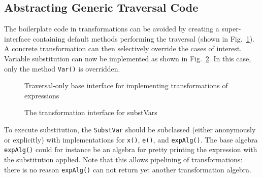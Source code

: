 \subsection{Abstracting Generic Traversal Code}

The boilerplate code in transformations can be avoided by creating a
super-interface containing default methods performing the traversal
(shown in Fig.~\ref{generic_transform}). A concrete transformation can
then selectively override the cases of interest. Variable substitution
can now be implemented as shown in Fig.~\ref{substvars_with_id}. In
this case, only the method \lstinline{Var()} is overridden.


\begin{figure}[t]
\vspace{-.1in}
\caption{Traversal-only base interface for implementing transformations of expressions}
\label{generic_transform}
\end{figure}


\begin{figure}[t]
\vspace{-.1in}
\caption{The transformation interface for substVars}
\label{substvars_with_id}
\end{figure}


To execute substitution, the \lstinline{SubstVar} should be subclassed
(either anonymously or explicitly) with implementations for
\lstinline{x()}, \lstinline{e()}, and \lstinline{expAlg()}. The base
algebra \lstinline{expAlg()} could for instance be an algebra for
pretty printing the expression with the substitution applied. Note
that this allows pipelining of transformations: there is no reason
\lstinline{expAlg()} can not return yet another transformation
algebra.

\begin{comment}
\haoyuan{Begin: client code.}

Here we also give the client code. With the same expression \lstinline{x + (y + 2)}, a \lstinline{SubstVar} object is created. The base algebra \lstinline{expAlg()} here is implemented with an instance of \lstinline{FreeVars}, and we also override \lstinline{x()} and \lstinline{e()} aiming to substitute another variable \lstinline{"z"} for \lstinline{"x"}. The code is as follows, where the result of execution becomes \lstinline{[y, z]}.


\haoyuan{End: client code.}
\end{comment}



